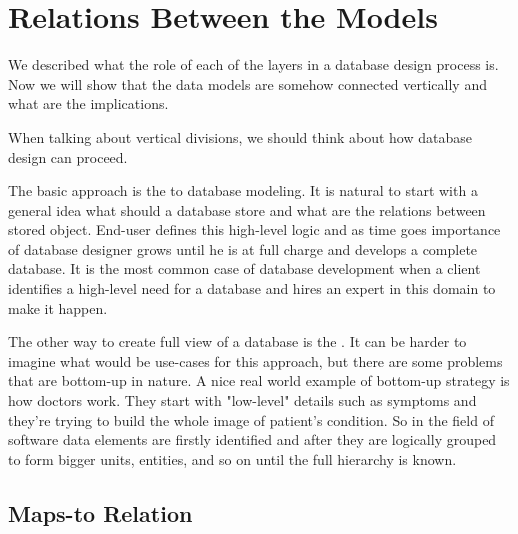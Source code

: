 
\section{Relations Between the Models}

We described what the role of each of the layers in a database design process is.
Now we will show that the data models are somehow connected vertically and what are the implications.

When talking about vertical divisions, we should think about how database design can proceed.

The basic approach is the  to database modeling.
It is natural to start with a general idea what should a database store and what are the relations between stored object. 
End-user defines this high-level logic and as time goes importance of database designer grows until he is at full charge and develops a complete database. It is the most common case of database development when a client identifies a high-level need for a database and hires an expert in this domain to make it happen.

The other way to create full view of a database is the . It can be harder to imagine what would be use-cases for this approach, but there are some problems that are bottom-up in nature. A nice real world example of bottom-up strategy is how doctors work. 
They start with "low-level" details such as symptoms and they're trying to build the whole image of patient's condition. So in the field of software data elements are firstly identified and after they are logically grouped to form bigger units, entities, and so on until the full hierarchy is known.

\subsection{Maps-to Relation}


